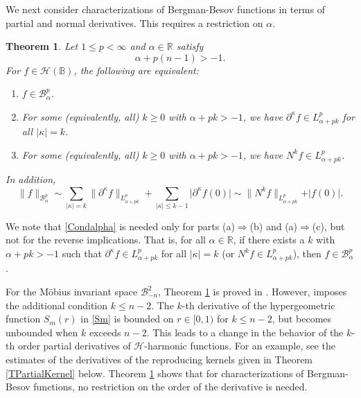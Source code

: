 \documentclass{amsart}
\newtheorem{theorem}{Theorem}[section]
\theoremstyle{definition}
\theoremstyle{remark}
\begin{document}
We next consider characterizations of Bergman-Besov functions in terms
of partial and normal derivatives.
This requires a restriction on $\alpha$.

\begin{theorem}\label{TBesovPartial}
Let $1\le p<\infty$ and $\alpha\in\mathbb R$ satisfy
\begin{equation}\label{Condalpha}
\alpha+p(n-1)>-1.
\end{equation}
For $f\in\mathcal H(\mathbb B)$, the following are equivalent:
\begin{enumerate}
  \item[(a)] $f\in \mathcal B^p_\alpha$.
  \item[(b)] For some (equivalently, all) $k\ge 0$ with $\alpha+pk>-1$,
  we have $\partial^\kappa f\in L^p_{\alpha+pk}$ for all
  $\vert\kappa\vert=k$.
  \item[(c)] For some (equivalently, all) $k\ge 0$ with $\alpha+pk>-1$,
  we have $N^k f\in L^p_{\alpha+pk}$.
\end{enumerate}
In addition,
\begin{equation*}
\|f\|_{\mathcal B^p_\alpha}
\sim \sum_{\vert\kappa\vert=k} \|\partial^\kappa f\|_{L^p_{\alpha+pk}}
     +\sum_{\vert\kappa\vert\le k-1} \vert\partial^\kappa f(0)\vert
\sim \|N^k f\|_{L^p_{\alpha+pk}}+\vert f(0)\vert.
\end{equation*}
\end{theorem}

We note that \eqref{Condalpha} is needed only for parts
(a)$\Rightarrow$(b) and (a)$\Rightarrow$(c), but not for the reverse
implications.
That is, for all $\alpha\in\mathbb R$, if there exists a $k$ with
$\alpha+pk>-1$ such that $\partial^\kappa f\in L^p_{\alpha+pk}$ for all
$\vert\kappa\vert=k$ (or $N^k f\in L^p_{\alpha+pk}$),
then $f\in\mathcal B^p_\alpha$.

For the M\"obius invariant space $\mathcal B^2_{-n}$,
Theorem \ref{TBesovPartial} is proved in \cite[Theorem 14]{BEY}.
However, \cite{BEY} imposes the additional condition $k\le n-2$.
The $k$-th derivative of the hypergeometric function
$S_m(r)$ in \eqref{Sm} is bounded on $r\in[0,1)$ for $k\le n-2$, but
becomes unbounded when $k$ exceeds $n-2$.
This leads to a change in the behavior of the $k$-th order partial
derivatives of $\mathcal H$-harmonic functions.
For an example, see the estimates of the derivatives of
the reproducing kernels given in Theorem \ref{TPartialKernel} below.
Theorem \ref{TBesovPartial} shows that for
characterizations of Bergman-Besov functions, no restriction on
the order of the derivative is needed.
\end{document}
